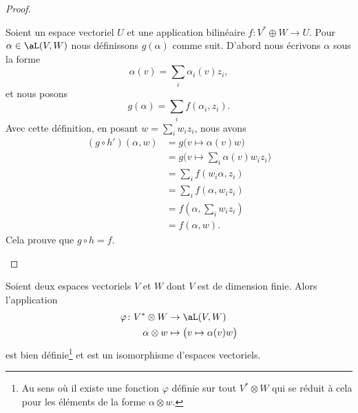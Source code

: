 \begin{proof}
\begin{subproof}
            Soient un espace vectoriel \( U\) et une application bilinéaire \( f\colon V^*\oplus W\to U\). Pour \( \alpha\in\aL(V,W)\) nous définissons \( g(\alpha)\) comme suit. D'abord nous écrivons \( \alpha\) sous la forme
            \begin{equation}
                \alpha(v)=\sum_i\alpha_i(v)z_i,
            \end{equation}
            et nous posons 
            \begin{equation}
                g(\alpha)=\sum_if(\alpha_i,z_i).
            \end{equation}
            Avec cette définition, en posant \( w=\sum_iw_iz_i\), nous avons
            \begin{subequations}
                \begin{align}
                    (g\circ h')(\alpha,w)&=g\big( v\mapsto \alpha(v)w \big)\\
                    &=g\big( v\mapsto \sum_i\alpha(v)w_iz_i \big)\\
                    &=\sum_if(w_i\alpha,z_i)\\
                    &=\sum_if(\alpha,w_iz_i)\\
                    &=f(\alpha,\sum_iw_iz_i)\\
                    &=f(\alpha,w).
                \end{align}
            \end{subequations}
            Cela prouve que \( g\circ h=f\).
    \end{subproof}
\end{proof}

\begin{proposition}      \label{PROPooKJTCooVTXWAQ}
    Soient deux espaces vectoriels \( V\) et \( W\) dont \( V\) est de dimension finie. Alors l'application
    \begin{equation}
        \begin{aligned}
            \varphi\colon V^*\otimes W&\to \aL(V,W) \\
            \alpha\otimes w&\mapsto \big( v\mapsto \alpha(v)w \big) 
        \end{aligned}
    \end{equation}
    est bien définie\footnote{Au sens où il existe une fonction $\varphi$ définie sur tout $V^*\otimes W$ qui se réduit à cela pour les éléments de la forme $\alpha\otimes w$.} et est un isomorphisme d'espaces vectoriels.
\end{proposition}

